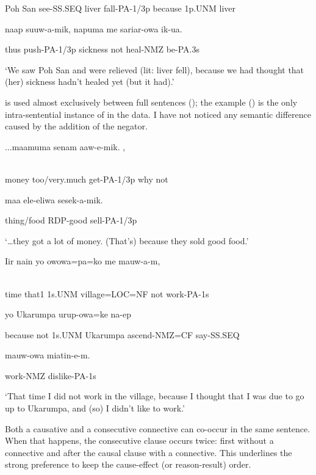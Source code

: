 Poh  San  see-SS.SEQ  liver  fall-PA-1/3p  because  1p.UNM  liver

naap  suuw-a-mik,  napuma  me  sariar-owa  ik-ua.

thus  push-PA-1/3p  sickness  not  heal-NMZ  be-PA.3s

`We saw Poh San and were relieved (lit: liver fell), because we had thought that (her) sickness hadn't healed yet (but it had).'

 is used almost exclusively between full sentences (); the example () is the only intra-sentential instance of  in the data. I have not noticed any semantic difference caused by the addition of the negator.

\ea%
\label{ex:x1906}
\gll ...maamuma  senam  aaw-e-mik.  , \\
      \\
\glt
\z

money  too/very.much  get-PA-1/3p  why  not  

maa  ele-eliwa  sesek-a-mik.

thing/food  RDP-good  sell-PA-1/3p

`{\dots}they got a lot of money. (That's) because they sold good food.'

\ea%
\label{ex:x1421}
\gll Iir  nain  yo  owowa=pa=ko  me  mauw-a-m, \\
      \\
\glt
\z

time  that1  1s.UNM  village=LOC=NF  not  work-PA-1s  

  yo  Ukarumpa  urup-owa=ke  na-ep

because  not  1s.UNM  Ukarumpa  ascend-NMZ=CF  say-SS.SEQ  

mauw-owa  miatin-e-m.

work-NMZ  dislike-PA-1s

`That time I did not work in the village, because I thought that I was due to go up to Ukarumpa, and (so) I didn't like to work.'

Both a causative and a consecutive connective can co-occur in the same sentence. When that happens, the consecutive clause occurs twice: first without a connective and after the causal clause with a connective. This underlines the strong preference to keep the cause-effect (or reason-result) order.

